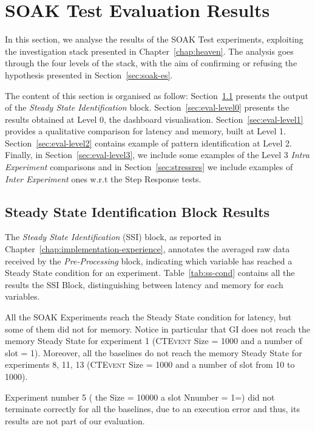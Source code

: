 \section{SOAK Test Evaluation Results}\label{sec:soakres}

In this section, we analyse the results of the SOAK Test experiments, exploiting the investigation stack presented in Chapter~\ref{chap:heaven}. The analysis goes through the four levels of the stack, with the aim of confirming or refusing the hypothesis presented in Section~\ref{sec:soak-es}. 

The content of this section is organised as follow: 
Section~\ref{sec:eval-ssib} presents the output of the \textit{Steady State Identification} block. 
Section~\ref{sec:eval-level0} presents the results obtained at Level 0, the dashboard visualisation.  
Section~\ref{sec:eval-level1} provides a qualitative comparison for latency and memory, built at Level 1. 
Section~\ref{sec:eval-level2} contains example of pattern identification at Level 2. 
Finally, in Section~\ref{sec:eval-level3}, we include some examples of the Level 3 \textit{Intra Experiment} comparisons and in Section~\ref{sec:stressres} we include examples of \textit{Inter Experiment }ones w.r.t the Step Response tests.


\subsection{Steady State Identification Block Results}\label{sec:eval-ssib}

The \textit{Steady State Identification} (SSI) block, as reported in Chapter~\ref{chap:implementation-experience}, annotates the averaged raw data received by the \textit{Pre-Processing} block, indicating which variable has reached a Steady State condition for an experiment. Table~\ref{tab:ss-cond} contains all the results the SSI Block, distinguishing between latency and memory for each variables.




All the SOAK Experiments reach the Steady State condition for latency, but some of them did not for memory. Notice in particular that GI does not reach the memory Steady State for experiment 1 (\textsc{CTEvent}  Size = 1000 and a number of slot = 1). Moreover, all the baselines do not reach the memory  Steady State for experiments 8, 11, 13 (\textsc{CTEvent}  Size = 1000 and a number of slot from 10 to 1000). 

Experiment number 5 ( the  Size = 10000 a slot Nnumber = 1=) did not terminate correctly for all the baselines, due to an execution error and thus, its results are not part of our evaluation.


